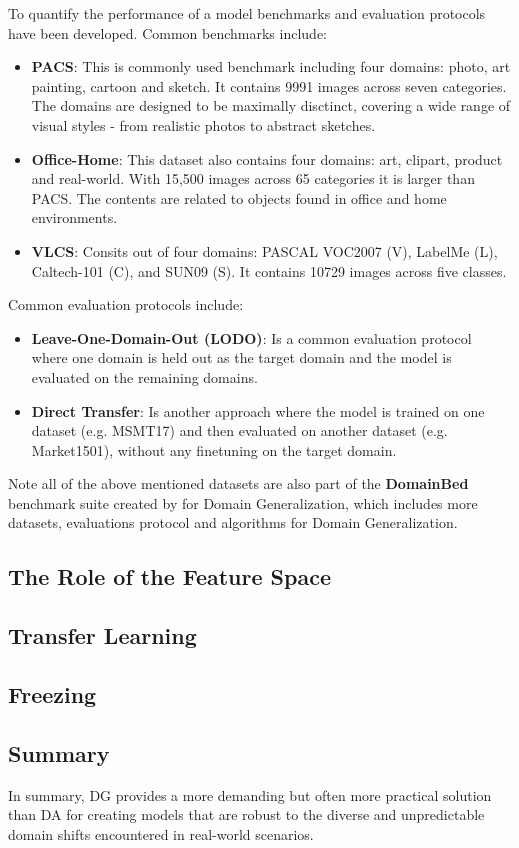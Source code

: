 To quantify the performance of a model benchmarks and evaluation protocols have been developed. Common benchmarks include:
\begin{itemize}
    \item \textbf{PACS}: \cite{liDeeperBroaderArtier2017} This is commonly used benchmark including four domains: photo, art painting, cartoon and sketch. It contains 9991 images across seven categories. The domains are designed to be maximally disctinct, covering a wide range of visual styles - from realistic photos to abstract sketches.
    \item \textbf{Office-Home}: \cite{venkateswaraDeepHashingNetwork2017} This dataset also contains four domains: art, clipart, product and real-world. With 15,500 images across 65 categories it is larger than PACS. The contents are related to objects found in office and home environments.
    \item \textbf{VLCS}: Consits out of four domains: PASCAL VOC2007 (V), LabelMe (L), Caltech-101 (C), and SUN09 (S). It contains 10729 images across five classes. %

\end{itemize}
Common evaluation protocols include:
\begin{itemize}
    \item \textbf{Leave-One-Domain-Out (LODO)}: Is a common evaluation protocol where one domain is held out as the target domain and the model is evaluated on the remaining domains. \cite{liDeeperBroaderArtier2017}
    \item \textbf{Direct Transfer}: Is another approach where the model is trained on one dataset (e.g. MSMT17) and then evaluated on another dataset (e.g. Market1501), without any finetuning on the target domain. \cite{chongLearningDomainInvariant2021}
\end{itemize}

Note all of the above mentioned datasets are also part of the \textbf{DomainBed} benchmark suite created by \cite{gulrajaniSearchLostDomain2020} for Domain Generalization, which includes more datasets, evaluations protocol and algorithms for Domain Generalization.

\subsection{The Role of the Feature Space}


\subsection{Transfer Learning}

\subsection{Freezing}

\subsection*{Summary}
In summary, DG provides a more demanding but often more practical solution than DA for creating models that are robust to the diverse and unpredictable domain shifts encountered in real-world scenarios.

\clearpage